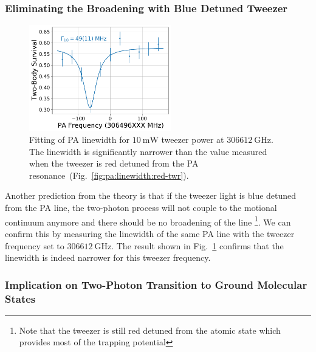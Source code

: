 \subsubsection{Eliminating the Broadening with Blue Detuned Tweezer}
\label{ch:pa:linewidth:blue-tweezer}

\begin{figure}
  \centering
  \includegraphics[width=0.55\textwidth]{figures/pa_spectrum_v12_blue_10.pdf}
  \caption[PA linewidth for blue detuned tweezer]{
    Fitting of PA linewidth for $10~\mathrm{mW}$ tweezer power at $306612~\mathrm{GHz}$.
    The linewidth is significantly narrower than the value measured when the tweezer
    is red detuned from the PA resonance~(Fig.~\ref{fig:pa:linewidth:red-twr}).
    \label{fig:pa:linewidth:blue-twr}}
\end{figure}

Another prediction from the theory is that if the tweezer light is blue detuned from
the PA line, the two-photon process will not couple to the motional continuum anymore
and there should be no broadening of the line
\footnote{Note that the tweezer is still red detuned from the atomic state which
  provides most of the trapping potential}.
We can confirm this by measuring the linewidth of the same PA line with the tweezer
frequency set to $306612~\mathrm{GHz}$.
The result shown in Fig.~\ref{fig:pa:linewidth:blue-twr}
confirms that the linewidth is indeed narrower for this tweezer frequency.

\subsubsection{Implication on Two-Photon Transition to Ground Molecular States}
\label{ch:pa:linewidth:raman}

